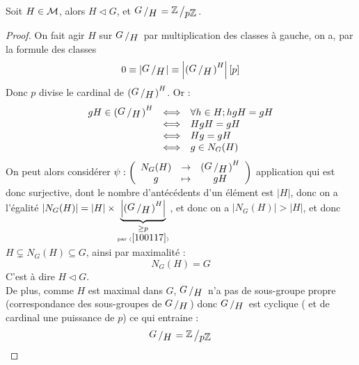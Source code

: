 \begin{lem}
	Soit $H \in \mathcal{M}$, alors $H \triangleleft G$, et $\bigslant{G}{H} = \bigslant{\bZ}{p\bZ}$.
\end{lem}
\begin{proof}
	On fait agir $H$ sur $\bigslant{G}{H}$ par multiplication des classes à gauche, on a, par la formule des classes 
	\begin{equation}\label{100117}
		0 \equiv \vert \bigslant{G}{H} \vert \equiv  \left\vert \left( \bigslant{G}{H} \right)^H \right\vert [p]
	\end{equation}
	\noindent Donc  $p$ divise le cardinal de $\left( \bigslant{G}{H} \right)^H $. Or :
	\[
		\begin{array}{lll}
			gH \in \left( \bigslant{G}{H} \right)^H  &\Longleftrightarrow& \forall h \in H;  hg H = gH\\
			 & \Longleftrightarrow&  Hg H = gH \\
			 &\Longleftrightarrow&  Hg = gH\\
			  &\Longleftrightarrow& g \in N_G(H)
		\end{array}
	\]
	\noindent On peut alors considérer $\psi : \left( \begin{array}{cccc} N_G(H) & \to &\left( \bigslant{G}{H} \right)^H \\ g & \mapsto &gH \end{array} \right)$ application qui est donc surjective, dont le nombre d'antécédents d'un élément est $\vert H \vert$, donc on a l'égalité $\vert N_G(H) \vert = \vert H \vert \times  \underbrace{\left\vert \left(\bigslant{G}{H} \right)^H  \right\vert}_{\underset{ \mbox{\tiny{par} } (\ref{100117}) }{ \geq p}}$, et donc on a  $\vert N_G(H) \vert > \vert H \vert$, et donc $H \subsetneq N_G(H) \subseteq G$, ainsi par maximalité :
	\begin{equation*} N_G(H) = G \end{equation*} \noindent C'est à dire $H \triangleleft G$.
	\\
	
	De plus, comme $H$ est maximal dans $G$, $\bigslant{G}{H}$ n'a pas de sous-groupe propre (correspondance des sous-groupes de $\bigslant{G}{H}$) donc $\bigslant{G}{H}$ est cyclique ( et de cardinal une puissance de $p$) ce qui entraine :  \begin{equation*} \bigslant{G}{H} = \bigslant{\bZ}{p\bZ} \end{equation*}
\end{proof}

